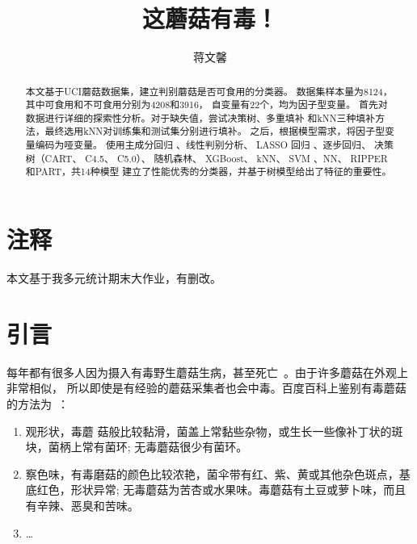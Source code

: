 \documentclass[lang=cn,11pt,a4paper,cite=super]{elegantpaper}
\title{这蘑菇有毒！}
\author{蒋文馨 \quad 16342067 \quad
   \email{jiangwx7@mail2.sysu.edu.cn}}
\institute{中山大学数学学院17级统计学}
\date{\zhtoday}
\begin{document}
\maketitle
\thispagestyle{empty}
\begin{abstract}
   本文基于UCI蘑菇数据集，建立判别蘑菇是否可食用的分类器。
   数据集样本量为8124，其中可食用和不可食用分别为4208和3916，
   自变量有22个，均为因子型变量。
   首先对数据进行详细的探索性分析。对于缺失值，尝试决策树、多重填补
   和kNN三种填补方法，最终选用kNN对训练集和测试集分别进行填补。
   之后，根据模型需求，将因子型变量编码为哑变量。
   使用主成分回归 、线性判别分析、 LASSO 回归 、逐步回归、
   决策树（CART、 C4.5、 C5.0）、 随机森林、 XGBoost、
   kNN、 SVM 、NN、 RIPPER 和PART，共14种模型
   建立了性能优秀的分类器，并基于树模型给出了特征的重要性。
\end{abstract}
\setcounter{tocdepth}{1}
\tableofcontents
\thispagestyle{empty}
\newpage

\setcounter{page}{1}
\setcounter{section}{-1}

\section{注释}
本文基于我多元统计期末大作业，有删改。

\section{引言}\label{sec:0}
每年都有很多人因为摄入有毒野生蘑菇生病，甚至死亡~\cite{zhongdu}。由于许多蘑菇在外观上非常相似，
所以即使是有经验的蘑菇采集者也会中毒。百度百科上鉴别有毒蘑菇的方法为~\cite{baike}：
\begin{enumerate}
   \itemsep = 0pt
   \item 观形状，毒蘑 菇般比较黏滑，菌盖上常黏些杂物，或生长一些像补丁状的斑块，菌柄上常有菌环;
      无毒蘑菇很少有菌环。
   \item 察色味，有毒磨菇的颜色比较浓艳，菌伞带有红、紫、黄或其他杂色斑点，基底红色，形状异常;
      无毒蘑菇为苦杏或水果味。毒蘑菇有土豆或萝卜味，而且有辛辣、恶臭和苦味。
   \item \dots
\end{enumerate}
\end{document}
